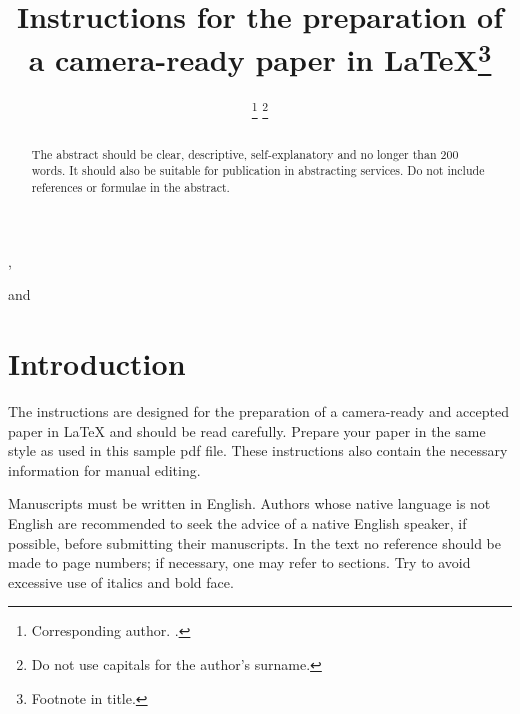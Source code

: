 \documentclass[ds]{iosart2x}
\begin{document}
\begin{frontmatter} %

%
\title{Instructions for the preparation of a camera-ready paper in \LaTeX\thanks{Footnote in title.}}



\author[A]{ %
\thanks{Corresponding author. .}%
\thanks{Do not use capitals for the author's surname.}},
\author[B]{ }
and
\author[B]{ }
\address[A]{Journal Production Department, , Nieuwe Hemweg 6b, 1013 BG, Amsterdam, }
\address[B]{Department first, ,
Abbreviate US states, }

\begin{abstract}
The abstract should be clear, descriptive, self-explanatory and no longer than 200 words. It should also
be suitable for publication in abstracting services. Do not include references or formulae in the abstract.
\end{abstract}

\begin{keyword}
\end{keyword}
\end{frontmatter}




\section{Introduction}

The instructions are designed for the preparation of a camera-ready and accepted paper in \LaTeX{} and should be read carefully.
Prepare your paper in the same style as used in this sample pdf file.
These instructions also contain the necessary information for manual editing.

Manuscripts must be written in English. Authors whose native language is not English are recommended to seek the advice of a native English speaker,
if possible, before submitting their manuscripts. In the text no reference should be made
to page numbers; if necessary, one may refer to sections. Try to avoid excessive use of italics and bold face.
\end{document}
